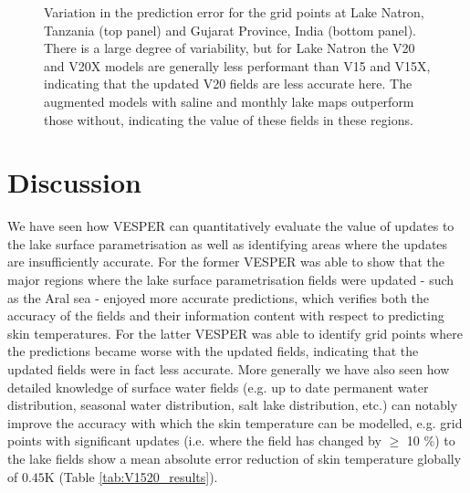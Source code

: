 \documentclass[twocolumn]{article}
\begin{document}
\begin{figure}
		\caption{Variation in the prediction error for the grid points at Lake Natron, Tanzania (top panel) and Gujarat Province, India (bottom panel). There is a large degree of variability, but for Lake Natron the V20 and V20X models are generally less performant than V15 and V15X, indicating that the updated V20 fields are less accurate here. The augmented models with saline and monthly lake maps outperform those without, indicating the value of these fields in these regions.} 
		\label{fig:timeseries_stacked}
	\end{figure}
	
	\section{Discussion} \label{sec:4}
	We have seen how VESPER can quantitatively evaluate the value of updates to the lake surface parametrisation as well as identifying areas where the updates are insufficiently accurate. For the former VESPER was able to show that the major regions where the lake surface parametrisation fields were updated - such as the Aral sea - enjoyed more accurate predictions, which verifies both the accuracy of the fields and their information content with respect to predicting skin temperatures. For the latter VESPER was able to identify grid points where the predictions became worse with the updated fields, indicating that the updated fields were in fact less accurate. More generally we have also seen how detailed knowledge of surface water fields (e.g. up to date permanent water distribution, seasonal water distribution, salt lake distribution, etc.) can notably improve the accuracy with which the skin temperature can be modelled, e.g. grid points with significant updates (i.e. where the field has changed by $\geq$ 10 \%) to the lake fields show a mean absolute error reduction of skin temperature globally of $0.45$K (Table \ref{tab:V1520_results}). 
	
\end{document}
